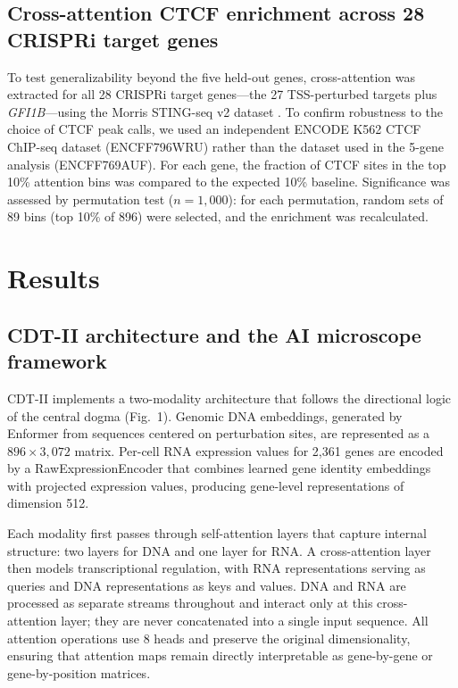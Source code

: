 \documentclass[12pt,a4paper]{article}
\begin{document}
\subsection{Cross-attention CTCF enrichment across 28 CRISPRi target genes}

To test generalizability beyond the five held-out genes, cross-attention was extracted for all 28 CRISPRi target genes---the 27 TSS-perturbed targets plus \textit{GFI1B}---using the Morris STING-seq v2 dataset \citep{morris2023}. To confirm robustness to the choice of CTCF peak calls, we used an independent ENCODE K562 CTCF ChIP-seq dataset (ENCFF796WRU) rather than the dataset used in the 5-gene analysis (ENCFF769AUF). For each gene, the fraction of CTCF sites in the top 10\% attention bins was compared to the expected 10\% baseline. Significance was assessed by permutation test ($n = 1{,}000$): for each permutation, random sets of 89 bins (top 10\% of 896) were selected, and the enrichment was recalculated.

\section{Results}

\subsection{CDT-II architecture and the AI microscope framework}

CDT-II implements a two-modality architecture that follows the directional logic of the central dogma (Fig.~1). Genomic DNA embeddings, generated by Enformer \citep{avsec2021enformer} from sequences centered on perturbation sites, are represented as a $896 \times 3{,}072$ matrix. Per-cell RNA expression values for 2,361 genes are encoded by a RawExpressionEncoder that combines learned gene identity embeddings with projected expression values, producing gene-level representations of dimension 512.

Each modality first passes through self-attention layers that capture internal structure: two layers for DNA and one layer for RNA. A cross-attention layer then models transcriptional regulation, with RNA representations serving as queries and DNA representations as keys and values. DNA and RNA are processed as separate streams throughout and interact only at this cross-attention layer; they are never concatenated into a single input sequence. All attention operations use 8 heads and preserve the original dimensionality, ensuring that attention maps remain directly interpretable as gene-by-gene or gene-by-position matrices.
\end{document}
